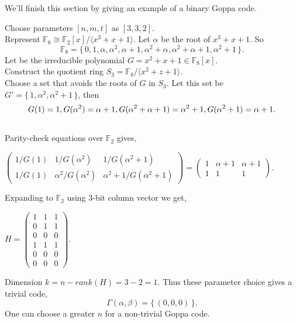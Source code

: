 We'll finish this section by giving an example of a binary Goppa code.
\begin{exmp}
    Choose parameters $[n, m, t]$ as $[3, 3, 2]$.\\
    Represent $\mathbb{F}_8 \cong \mathbb{F}_2[x]/ \langle x^3+x+1 \rangle$. Let $\alpha$ be the root of $x^3+x+1$. So \[\mathbb{F}_8 = \{\,0,1,\alpha,\alpha^2,\alpha+1,\alpha^2+\alpha, \alpha^2+\alpha+1,\alpha^2+1\,\}.\] 
    Let be the irreducible polynomial $G = x^2+x+1 \in \mathbb{F}_8[x]$.\\
    Construct the quotient ring $S_3 = \mathbb{F}_8/\langle x^2+z+1\rangle.$\\
    Choose a set that avoids the roots of $G$ in $S_3$. Let this set be 
    $G'=\{\,1, \alpha^2,\alpha^2+1\,\}$, then
    \[        
    \noindent G(1)=1\\,G(\alpha^2)=\alpha+1\\,
    G(\alpha^2+\alpha+1)=\alpha^2+1\\,G(\alpha^2+1)=\alpha+1.
    \]\\
    Parity-check equations over $\mathbb{F}_2$ gives,
\begin{center}
    $\begin{pmatrix}
    1/G(1) &1/G(\alpha^2)& 1/G(\alpha^2+1)\\
    1/G(1) &\alpha^2/G(\alpha^2)& \alpha^2+1/G(\alpha^2+1)
    \end{pmatrix} = \begin{pmatrix}
    1 & \alpha+1 & \alpha+1\\
    1 & 1 & 1
    \end{pmatrix}.$\\[0.4cm]
\end{center}
    Expanding to $\mathbb{F}_2$ using 3-bit column vector we get,
\begin{center}
    $H=\begin{pmatrix}
        1&1&1\\
        0&1&1\\
        0&0&0\\
        1&1&1\\
        0&0&0\\
        0&0&0
    \end{pmatrix}.$\\[0.4cm]
\end{center}
    Dimension $k = n-rank(H)=3-2=1$. Thus these parameter choice gives a trivial code, \[\Gamma(\alpha, \beta) = \{\,(0,0,0)\,\}.\]
    One can choose a greater $n$ for a non-trivial Goppa code.
\end{exmp}


